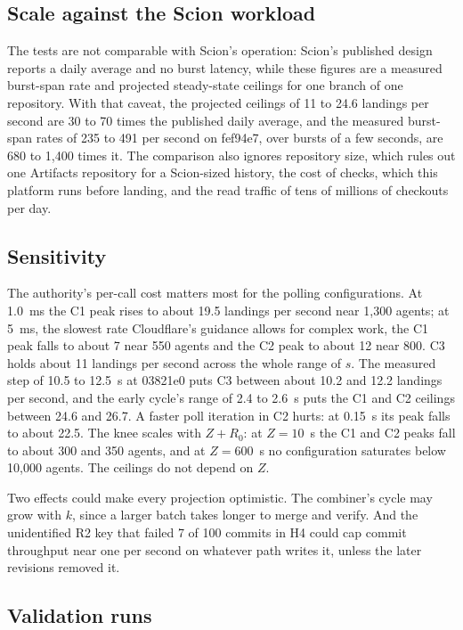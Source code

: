 \documentclass[11pt,letterpaper]{article}
\theoremstyle{definition}
\theoremstyle{remark}
\begin{document}
\subsection{Scale against the Scion workload}

The tests are not comparable with Scion's operation: Scion's published design reports a daily average and no burst latency, while these figures are a measured burst-span rate and projected steady-state ceilings for one branch of one repository. With that caveat, the projected ceilings of 11 to 24.6 landings per second are 30 to 70 times the published daily average, and the measured burst-span rates of 235 to 491 per second on fef94e7, over bursts of a few seconds, are 680 to 1,400 times it. %
The comparison also ignores repository size, which rules out one Artifacts repository for a Scion-sized history, the cost of checks, which this platform runs before landing, and the read traffic of tens of millions of checkouts per day. %

\subsection{Sensitivity}

The authority's per-call cost matters most for the polling configurations. At 1.0~ms the C1 peak rises to about 19.5 landings per second near 1,300 agents; at 5~ms, the slowest rate Cloudflare's guidance allows for complex work, the C1 peak falls to about 7 near 550 agents and the C2 peak to about 12 near 800. C3 holds about 11 landings per second across the whole range of $s$. The measured step of 10.5 to 12.5~s at 03821e0 puts C3 between about 10.2 and 12.2 landings per second, and the early cycle's range of 2.4 to 2.6~s puts the C1 and C2 ceilings between 24.6 and 26.7. A faster poll iteration in C2 hurts: at 0.15~s its peak falls to about 22.5. The knee scales with $Z + R_0$: at $Z = 10$~s the C1 and C2 peaks fall to about 300 and 350 agents, and at $Z = 600$~s no configuration saturates below 10,000 agents. The ceilings do not depend on $Z$.

Two effects could make every projection optimistic. The combiner's cycle may grow with $k$, since a larger batch takes longer to merge and verify. And the unidentified R2 key that failed 7 of 100 commits in H4 could cap commit throughput near one per second on whatever path writes it, unless the later revisions removed it. %

\subsection{Validation runs}
\end{document}
